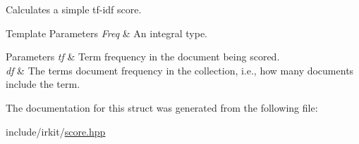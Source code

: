 Calculates a simple tf-\/idf score. 


\begin{DoxyTemplParams}{Template Parameters}
{\em Freq} & An integral type. \\
\hline
\end{DoxyTemplParams}

\begin{DoxyParams}{Parameters}
{\em tf} & Term frequency in the document being scored. \\
\hline
{\em df} & The term\textquotesingle{}s document frequency in the collection, i.\+e., how many documents include the term. \\
\hline
\end{DoxyParams}


The documentation for this struct was generated from the following file\+:\begin{DoxyCompactItemize}
\item 
include/irkit/\mbox{\hyperlink{score_8hpp}{score.\+hpp}}\end{DoxyCompactItemize}
